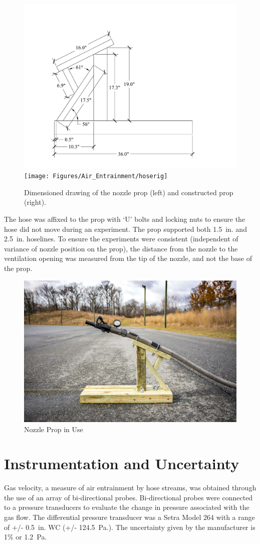 \documentclass[12pt,oneside]{book}
\begin{document}
\begin{figure}[!ht]
\centering
    \includegraphics[width=.45\columnwidth]{Figures/Water_Distribution/GIBside}
	\texttt{[image: Figures/Air\_Entrainment/hoserig]}
	\caption[Nozzle Prop]{Dimensioned drawing of the nozzle prop (left) and constructed prop (right).}
	\label{fig:Nozzle_Prop}
\end{figure}

The hose was affixed to the prop with `U' bolts and locking nuts to ensure the hose did not move during an experiment. The prop supported both 1.5~in. and 2.5~in. hoselines. To ensure the experiments were consistent (independent of variance of nozzle position on the prop), the distance from the nozzle to the ventilation opening was measured from the tip of the nozzle, and not the base of the prop.

\begin{figure}[!ht]
\centering
\includegraphics[width=.6\columnwidth]{Figures/Air_Entrainment/gib_hose} 
\caption{Nozzle Prop in Use}
\label{fig:Nozzle_Prop_in_Use}
\end{figure}

\section{Instrumentation and Uncertainty}
\label{sec:uncert}
Gas velocity, a measure of air entrainment by hose streams, was obtained through the use of an array of bi-directional probes. Bi-directional probes were connected to a pressure transducers to evaluate the change in pressure associated with the gas flow. The differential pressure transducer was a Setra Model 264 with a range of +/- 0.5~in. WC (+/- 124.5~Pa.). The uncertainty given by the manufacturer is 1\% or 1.2~Pa. 
\end{document}
